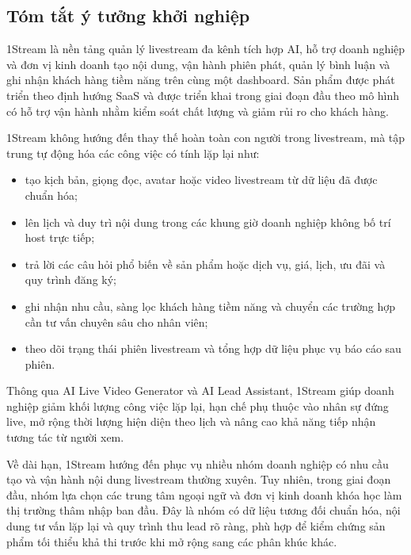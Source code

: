 \subsection{Tóm tắt ý tưởng khởi nghiệp}

1Stream là nền tảng quản lý livestream đa kênh tích hợp AI, hỗ trợ doanh nghiệp
và đơn vị kinh doanh tạo nội dung, vận hành phiên phát, quản lý bình luận và ghi
nhận khách hàng tiềm năng trên cùng một dashboard. Sản phẩm được phát triển theo
định hướng SaaS và được triển khai trong giai đoạn đầu theo mô hình có hỗ trợ vận
hành nhằm kiểm soát chất lượng và giảm rủi ro cho khách hàng.

1Stream không hướng đến thay thế hoàn toàn con người trong livestream, mà tập
trung tự động hóa các công việc có tính lặp lại như:

\begin{itemize}
    \item tạo kịch bản, giọng đọc, avatar hoặc video livestream từ dữ liệu đã
    được chuẩn hóa;

    \item lên lịch và duy trì nội dung trong các khung giờ doanh nghiệp không
    bố trí host trực tiếp;

    \item trả lời các câu hỏi phổ biến về sản phẩm hoặc dịch vụ, giá, lịch,
    ưu đãi và quy trình đăng ký;

    \item ghi nhận nhu cầu, sàng lọc khách hàng tiềm năng và chuyển các trường
    hợp cần tư vấn chuyên sâu cho nhân viên;

    \item theo dõi trạng thái phiên livestream và tổng hợp dữ liệu phục vụ báo
    cáo sau phiên.
\end{itemize}

Thông qua AI Live Video Generator và AI Lead Assistant, 1Stream giúp doanh
nghiệp giảm khối lượng công việc lặp lại, hạn chế phụ thuộc vào nhân sự đứng
live, mở rộng thời lượng hiện diện theo lịch và nâng cao khả năng tiếp nhận tương
tác từ người xem.

Về dài hạn, 1Stream hướng đến phục vụ nhiều nhóm doanh nghiệp có nhu cầu tạo và
vận hành nội dung livestream thường xuyên. Tuy nhiên, trong giai đoạn đầu, nhóm
lựa chọn các trung tâm ngoại ngữ và đơn vị kinh doanh khóa học làm thị trường
thâm nhập ban đầu. Đây là nhóm có dữ liệu tương đối chuẩn hóa, nội dung tư vấn
lặp lại và quy trình thu lead rõ ràng, phù hợp để kiểm chứng sản phẩm tối thiểu
khả thi trước khi mở rộng sang các phân khúc khác.